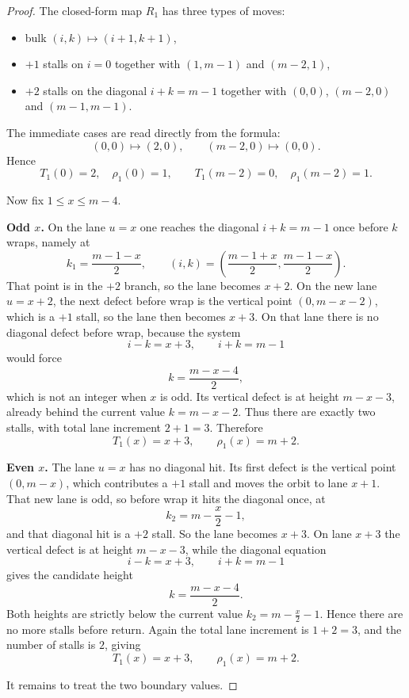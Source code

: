 \documentclass[11pt]{article}
\begin{document}
\begin{proof}
The closed-form map $R_1$ has three types of moves:
\begin{itemize}[leftmargin=2em]
\item bulk $(i,k)\mapsto(i+1,k+1)$,
\item $+1$ stalls on $i=0$ together with $(1,m-1)$ and $(m-2,1)$,
\item $+2$ stalls on the diagonal $i+k=m-1$ together with $(0,0)$, $(m-2,0)$ and $(m-1,m-1)$.
\end{itemize}

The immediate cases are read directly from the formula:
\[
(0,0)\mapsto(2,0),\qquad (m-2,0)\mapsto(0,0).
\]
Hence
\[
T_1(0)=2,\quad \rho_1(0)=1,\qquad T_1(m-2)=0,\quad \rho_1(m-2)=1.
\]

Now fix $1\le x\le m-4$.

\smallskip
\noindent\textbf{Odd $x$.}
On the lane $u=x$ one reaches the diagonal $i+k=m-1$ once before $k$ wraps, namely at
\[
k_1=\frac{m-1-x}{2},\qquad
(i,k)=\left(\frac{m-1+x}{2},\frac{m-1-x}{2}\right).
\]
That point is in the $+2$ branch, so the lane becomes $x+2$.
On the new lane $u=x+2$, the next defect before wrap is the vertical point $(0,m-x-2)$, which is a $+1$
stall, so the lane then becomes $x+3$.
On that lane there is no diagonal defect before wrap, because the system
\[
i-k=x+3,\qquad i+k=m-1
\]
would force
\[
k=\frac{m-x-4}{2},
\]
which is not an integer when $x$ is odd.
Its vertical defect is at height $m-x-3$, already behind the current value $k=m-x-2$.
Thus there are exactly two stalls, with total lane increment $2+1=3$.
Therefore
\[
T_1(x)=x+3,\qquad \rho_1(x)=m+2.
\]

\smallskip
\noindent\textbf{Even $x$.}
The lane $u=x$ has no diagonal hit.
Its first defect is the vertical point $(0,m-x)$, which contributes a $+1$ stall and moves the orbit to
lane $x+1$.
That new lane is odd, so before wrap it hits the diagonal once, at
\[
k_2=m-\frac{x}{2}-1,
\]
and that diagonal hit is a $+2$ stall.
So the lane becomes $x+3$.
On lane $x+3$ the vertical defect is at height $m-x-3$, while the diagonal equation
\[
i-k=x+3,\qquad i+k=m-1
\]
gives the candidate height
\[
k=\frac{m-x-4}{2}.
\]
Both heights are strictly below the current value $k_2=m-\frac{x}{2}-1$.
Hence there are no more stalls before return.
Again the total lane increment is $1+2=3$, and the number of stalls is $2$, giving
\[
T_1(x)=x+3,\qquad \rho_1(x)=m+2.
\]

It remains to treat the two boundary values.


\end{proof}
\end{document}
